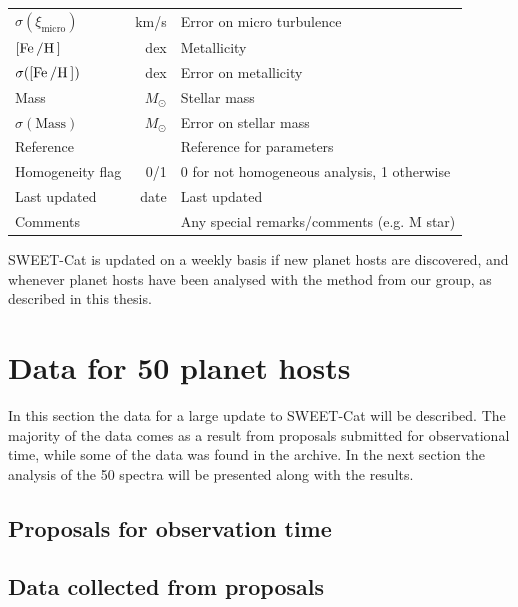 \begin{table}[htb!]
\begin{tabular}{lrl}
      $\sigma(\xi_\mathrm{micro})$   & \si{km/s} & Error on micro turbulence                            \\
      $[\ion{Fe}/\ion{H}]$           & \si{dex}  & Metallicity                                          \\
      $\sigma([\ion{Fe}/\ion{H}])$   & \si{dex}  & Error on metallicity                                 \\
      Mass                           & $M_\odot$ & Stellar mass                                         \\
      $\sigma(\mathrm{Mass})$        & $M_\odot$ & Error on stellar mass                                \\
      Reference                      &           & Reference for parameters                             \\
      Homogeneity flag               & 0/1       & 0 for not homogeneous analysis, 1 otherwise          \\
      Last updated                   & date      & Last updated                                         \\
      Comments                       &           & Any special remarks/comments (e.g. M star)           \\
      \hline
    \end{tabular}
\end{table}

SWEET-Cat is updated on a weekly basis if new planet hosts are discovered, and whenever planet hosts
have been analysed with the method from our group, as described in this thesis.


\section{Data for 50 planet hosts}

In this section the data for a large update to SWEET-Cat will be described. The majority of the data
comes as a result from proposals submitted for observational time, while some of the data was found
in the archive. In the next section the analysis of the 50 spectra will be presented along with the
results.


\subsection{Proposals for observation time}



\subsection{Data collected from proposals}



